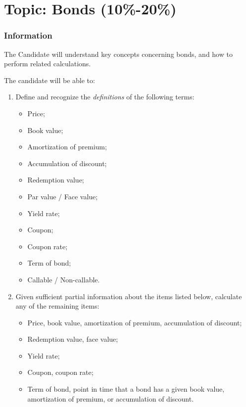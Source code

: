 \chapter[Topic: Bonds]{Topic: Bonds (10\%-20\%)}

\subsection{Information}

\begin{distributions}[Objective]
The Candidate will understand key concepts concerning bonds, and how to perform related calculations.
\end{distributions}

\begin{outcomes}
The candidate will be able to:
\begin{enumerate}[label = \alph*)]
	\item	Define and recognize the \textit{definitions} of the following terms:
		\begin{multicols*}{2}
		\begin{itemize}[leftmargin = *]
		\item	Price;
		\item	Book value;
		\item	Amortization of premium;
		\item	Accumulation of discount;
		\item	Redemption value;
		\item	Par value / Face value;
		\item	Yield rate;
		\item	Coupon;
		\item	Coupon rate;
		\item	Term of bond;
		\item	Callable / Non-callable.
		\end{itemize}
		\end{multicols*}
	\item	Given sufficient partial information about the items listed below, calculate any of the remaining items:
		\begin{itemize}[leftmargin = *]
		\item	Price, book value, amortization of premium, accumulation of discount;
		\item	Redemption value, face value;
		\item	Yield rate;
		\item	Coupon, coupon rate;
		\item	Term of bond, point in time that a bond has a given book value, amortization of premium, or accumulation of discount.
		\end{itemize}
\end{enumerate}
\end{outcomes}

